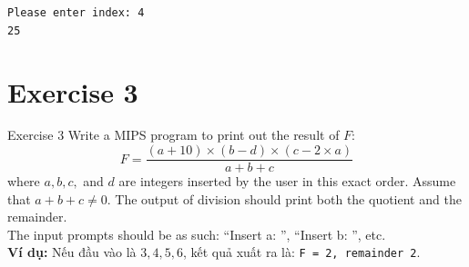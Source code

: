 \documentclass[a4paper]{article}
\numberwithin{figure}{section}
\numberwithin{table}{section}
\begin{document}
\begin{outputbox}
\texttt{Please enter index: 4}\\
\texttt{25}
\end{outputbox}

\pagebreak

\section{Exercise 3}

\begin{problembox}{Exercise 3}
Write a MIPS program to print out the result of $F$:
\begin{equation*}
    F = \frac{(a + 10) \times (b - d) \times (c - 2 \times a)}{a + b + c}
\end{equation*}
where $a, b, c,$ and $d$ are integers inserted by the user in this exact order. Assume that $a + b + c \neq 0$. The output of division should print both the quotient and the remainder.\\
The input prompts should be as such: ``Insert a: '', ``Insert b: '', etc.\\
\textbf{Ví dụ:} Nếu đầu vào là $3, 4, 5, 6$, kết quả xuất ra là: \texttt{F = 2, remainder 2}.
\end{problembox}
\end{document}
